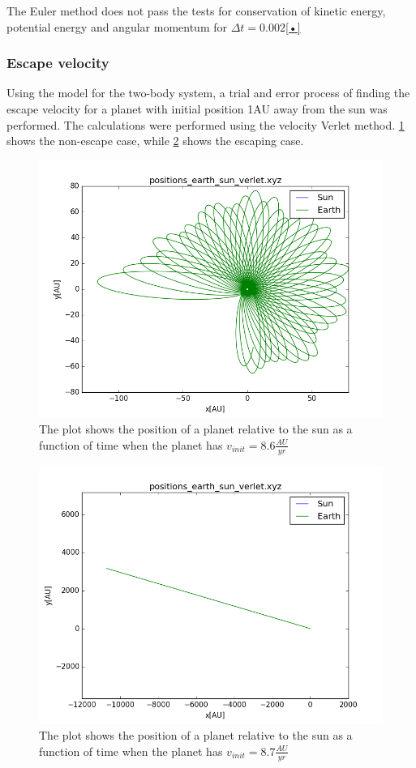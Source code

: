 The Euler method does not pass the tests for conservation of kinetic energy, potential energy and angular momentum for $\Delta t = 0.002$\ref{•}

\subsubsection{Escape velocity}\label{results:escape-velocity}
Using the model for the two-body system, a trial and error process of finding the escape velocity
for a planet with initial position 1AU away from the sun was performed. The calculations were
performed using the velocity Verlet method. \ref{fig:escape-no} shows the non-escape case, while
\ref{fig:escape-yes} shows the escaping case.
\begin{figure}[H]\label{fig:escape-no}
\includegraphics[width=\textwidth]{figures/escape_86}
\caption{The plot shows the position of a planet relative to the sun as a function of time when 
the planet has $v_{init} = 8.6\tfrac{AU}{yr}$}
\end{figure}
\begin{figure}[H]\label{fig:escape-yes}
\includegraphics[width=\textwidth]{figures/escape_87}
\caption{The plot shows the position of a planet relative to the sun as a function of time when 
the planet has $v_{init} = 8.7\tfrac{AU}{yr}$}
\end{figure}

